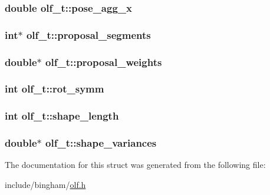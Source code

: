 \hypertarget{structolf__t_a6cf73c2f9069a7625cad89eb760290f3}{
\subsubsection[{pose\_\-agg\_\-x}]{\setlength{\rightskip}{0pt plus 5cm}double {\bf olf\_\-t::pose\_\-agg\_\-x}}}
\label{structolf__t_a6cf73c2f9069a7625cad89eb760290f3}
\hypertarget{structolf__t_aa28705cbd4736e5e4d1c890b9b67c8ef}{
\subsubsection[{proposal\_\-segments}]{\setlength{\rightskip}{0pt plus 5cm}int$\ast$ {\bf olf\_\-t::proposal\_\-segments}}}
\label{structolf__t_aa28705cbd4736e5e4d1c890b9b67c8ef}
\hypertarget{structolf__t_a679ce77cdfe562926b008b2b30596047}{
\subsubsection[{proposal\_\-weights}]{\setlength{\rightskip}{0pt plus 5cm}double$\ast$ {\bf olf\_\-t::proposal\_\-weights}}}
\label{structolf__t_a679ce77cdfe562926b008b2b30596047}
\hypertarget{structolf__t_a6dd43baa1efad15b1fee44b47e627af9}{
\subsubsection[{rot\_\-symm}]{\setlength{\rightskip}{0pt plus 5cm}int {\bf olf\_\-t::rot\_\-symm}}}
\label{structolf__t_a6dd43baa1efad15b1fee44b47e627af9}
\hypertarget{structolf__t_a324ef3ce6e8c10036b1e11ee6af0a833}{
\subsubsection[{shape\_\-length}]{\setlength{\rightskip}{0pt plus 5cm}int {\bf olf\_\-t::shape\_\-length}}}
\label{structolf__t_a324ef3ce6e8c10036b1e11ee6af0a833}
\hypertarget{structolf__t_a995e14cf5dc74ff0d953b2c0c0ba6605}{
\subsubsection[{shape\_\-variances}]{\setlength{\rightskip}{0pt plus 5cm}double$\ast$ {\bf olf\_\-t::shape\_\-variances}}}
\label{structolf__t_a995e14cf5dc74ff0d953b2c0c0ba6605}


The documentation for this struct was generated from the following file:\begin{DoxyCompactItemize}
\item 
include/bingham/\hyperlink{olf_8h}{olf.h}\end{DoxyCompactItemize}
